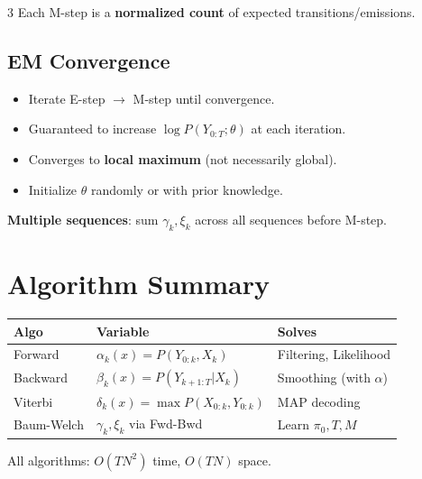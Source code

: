 \documentclass[9pt,landscape]{article}
\begin{document}
\begin{multicols}{3}
Each M-step is a \textbf{normalized count} of expected transitions/emissions.

\subsection{EM Convergence}
\begin{itemize}
  \item Iterate E-step $\to$ M-step until convergence.
  \item Guaranteed to increase $\log P(Y_{0:T};\theta)$ at each iteration.
  \item Converges to \textbf{local maximum} (not necessarily global).
  \item Initialize $\theta$ randomly or with prior knowledge.
\end{itemize}

\textbf{Multiple sequences}: sum $\gamma_k,\xi_k$ across all sequences before M-step.

\section{Algorithm Summary}

\begin{tabular}{@{}lll@{}}
\toprule
\textbf{Algo} & \textbf{Variable} & \textbf{Solves}\\
\midrule
Forward & $\alpha_k(x)=P(Y_{0:k},X_k)$ & Filtering, Likelihood\\
Backward & $\beta_k(x)=P(Y_{k+1:T}|X_k)$ & Smoothing (with $\alpha$)\\
Viterbi & $\delta_k(x)=\max P(X_{0:k},Y_{0:k})$ & MAP decoding\\
Baum-Welch & $\gamma_k,\xi_k$ via Fwd-Bwd & Learn $\pi_0,T,M$\\
\bottomrule
\end{tabular}

\vspace{4pt}
All algorithms: $O(TN^2)$ time, $O(TN)$ space.

\end{multicols}
\end{document}
